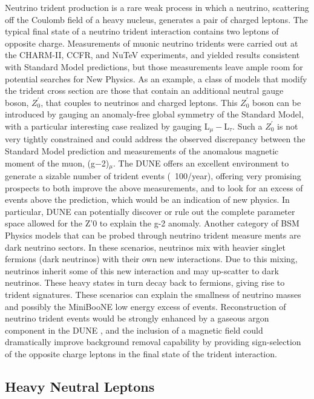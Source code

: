 Neutrino trident production is a rare weak process in which a neutrino, scattering off the Coulomb field of a heavy nucleus, generates a pair of charged leptons. The typical final state of a neutrino trident interaction contains two leptons of opposite charge.
Measurements of muonic neutrino tridents were carried out at the CHARM-II, CCFR, and NuTeV experiments, and yielded results consistent with Standard Model predictions, but those measurements leave ample room for potential searches for New Physics. As an example, a class of models that modify the trident cross section are those that contain an additional neutral gauge boson, $Z^{\prime}_0$, that couples to neutrinos and charged leptons. This $Z^{\prime}_0$ boson can be introduced by gauging an anomaly-free global symmetry of the Standard Model, with a particular interesting case realized by gauging L$_{\mu} -$L$_{\tau}$. Such a $Z^{\prime}_0$ is not very tightly constrained and could address the observed discrepancy between the Standard Model prediction and measurements of the anomalous magnetic moment of the muon, (g$-$2)$_{\mu}$. The DUNE  offers an excellent environment to generate a sizable number of trident events (~100/year), offering very promising prospects to both improve the above measurements, and to look for an excess of events above the  prediction, which would be an indication of new physics. In particular, DUNE can potentially discover or rule out the complete parameter space allowed for the Z'0 to explain the g-2 anomaly. Another category of BSM Physics models that can be probed through neutrino trident measure ments are dark neutrino sectors. In these scenarios,  neutrinos mix with heavier  singlet fermions (dark neutrinos) with their own new interactions. Due to this mixing, neutrinos inherit some of this new interaction and may up-scatter to dark neutrinos. These heavy states in turn decay back to  fermions, giving rise to trident signatures. These scenarios can explain the smallness of neutrino masses and possibly the MiniBooNE low energy excess of events. Reconstruction of neutrino trident events would be strongly enhanced by a gaseous argon component in the DUNE , and the inclusion of a magnetic field could dramatically  improve background removal capability by providing sign-selection of the opposite charge leptons in the final state of the trident interaction. 

\subsection{Heavy Neutral Leptons}
\label{ssec:exsum-nd-BSMappendix-HNleptons}

